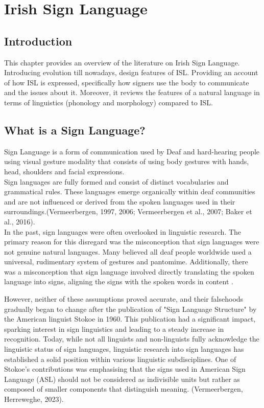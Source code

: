 \chapter{Irish Sign Language}


\section{Introduction}

This chapter provides an overview of the literature on Irish Sign Language. Introducing evolution till nowadays, design features of ISL. Providing an account of how ISL is expressed, specifically how signers use the body to communicate and the issues about it. Moreover, it reviews the features of a natural language in terms of linguistics (phonology and morphology) compared to ISL. 

\section{What is a Sign Language?}

Sign Language is a form of communication used by Deaf and hard-hearing people using visual gesture modality that consists of using body gestures with hands, head, shoulders and facial expressions. \cite{vermeerbergen2023} \\
Sign languages are fully formed and consist of distinct vocabularies and grammatical rules. These languages emerge organically within deaf communities and are not influenced or derived from the spoken languages used in their surroundings.(Vermeerbergen, 1997, 2006; Vermeerbergen et al., 2007; Baker et al., 2016). \\

In the past, sign languages were often overlooked in linguistic research. The primary reason for this disregard was the misconception that sign languages were not genuine natural languages. Many believed all deaf people worldwide used a universal, rudimentary system of gestures and pantomime. Additionally, there was a misconception that sign language involved directly translating the spoken language into signs, aligning the signs with the spoken words in content \cite{vermeerbergen2023}.  

However, neither of these assumptions proved accurate, and their falsehoods gradually began to change after the publication of "Sign Language Structure" by the American linguist Stokoe in 1960. This publication had a significant impact, sparking interest in sign linguistics and leading to a steady increase in recognition. Today, while not all linguists and non-linguists fully acknowledge the linguistic status of sign languages, linguistic research into sign languages has established a solid position within various linguistic subdisciplines. One of Stokoe's contributions was emphasising that the signs used in American Sign Language (ASL) should not be considered as indivisible units but rather as composed of smaller components that distinguish meaning. (Vermeerbergen, Herreweghe, 2023).

